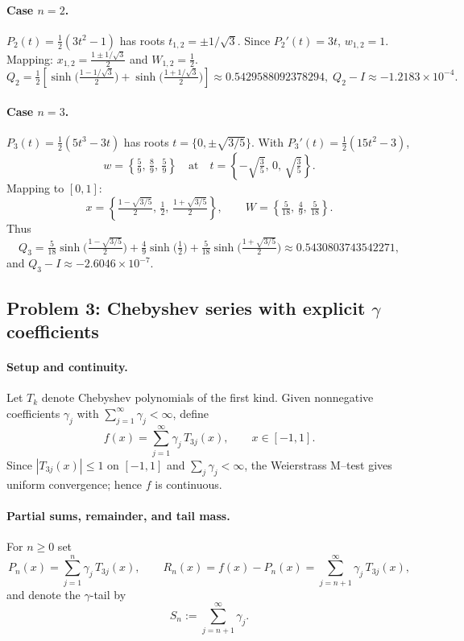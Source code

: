 \documentclass[12pt,a4paper]{article}
\theoremstyle{plain}
\theoremstyle{definition}
\theoremstyle{remark}
\theoremstyle{remark}
\begin{document}
\paragraph{Case $n=2$.}
$P_2(t)=\tfrac12(3t^2-1)$ has roots $t_{1,2}=\pm 1/\sqrt{3}$.
Since $P_2'(t)=3t$, $w_{1,2}=1$.
Mapping: $x_{1,2}=\frac{1\pm 1/\sqrt{3}}{2}$ and $W_{1,2}=\tfrac12$.
\[
Q_2=\tfrac12\!\left[\sinh\!\Big(\tfrac{1-1/\sqrt{3}}{2}\Big)+
\sinh\!\Big(\tfrac{1+1/\sqrt{3}}{2}\Big)\right]
\approx 0.5429588092378294,\;
Q_2-I\approx -1.2183\times 10^{-4}.
\]

\paragraph{Case $n=3$.}
$P_3(t)=\tfrac12(5t^3-3t)$ has roots $t=\{0,\pm\sqrt{3/5}\}$.
With $P_3'(t)=\tfrac12(15t^2-3)$,
\[
w=\left\{\tfrac{5}{9},\,\tfrac{8}{9},\,\tfrac{5}{9}\right\}
\quad\text{at}\quad
t=\left\{-\sqrt{\tfrac35},\,0,\,\sqrt{\tfrac35}\right\}.
\]
Mapping to $[0,1]$:
\[
x=\left\{\tfrac{1-\sqrt{3/5}}{2},\,\tfrac12,\,\tfrac{1+\sqrt{3/5}}{2}\right\},\qquad
W=\left\{\tfrac{5}{18},\,\tfrac{4}{9},\,\tfrac{5}{18}\right\}.
\]
Thus
\[
Q_3=\tfrac{5}{18}\sinh\!\Big(\tfrac{1-\sqrt{3/5}}{2}\Big)
+\tfrac{4}{9}\sinh\!\Big(\tfrac12\Big)
+\tfrac{5}{18}\sinh\!\Big(\tfrac{1+\sqrt{3/5}}{2}\Big)
\approx 0.5430803743542271,
\]
and $Q_3-I\approx -2.6046\times 10^{-7}$.
	
	
\subsection*{Problem 3: Chebyshev series with explicit {$\gamma$} coefficients}

\paragraph{Setup and continuity.}
Let $T_k$ denote Chebyshev polynomials of the first kind. Given nonnegative coefficients
$\gamma_j$ with $\sum_{j=1}^\infty \gamma_j<\infty$, define
\[
f(x)=\sum_{j=1}^\infty \gamma_j\,T_{3j}(x),\qquad x\in[-1,1].
\]
Since $|T_{3j}(x)|\le 1$ on $[-1,1]$ and $\sum_j\gamma_j<\infty$, the Weierstrass M--test gives
uniform convergence; hence $f$ is continuous.

\paragraph{Partial sums, remainder, and tail mass.}
For $n\ge 0$ set
\[
P_n(x)=\sum_{j=1}^{n}\gamma_j\,T_{3j}(x),\qquad
R_n(x)=f(x)-P_n(x)=\sum_{j=n+1}^{\infty}\gamma_j\,T_{3j}(x),
\]
and denote the $\gamma$-tail by
\[
S_n:=\sum_{j=n+1}^{\infty}\gamma_j .
\]
\end{document}
